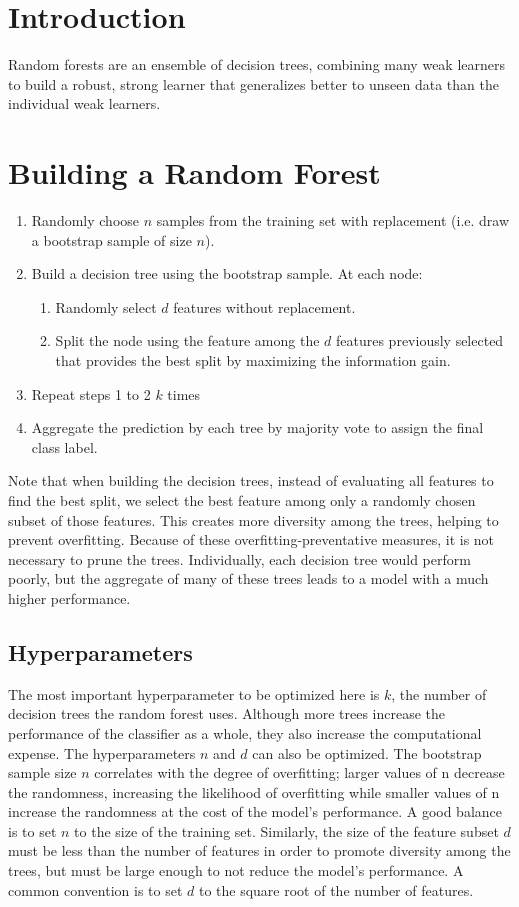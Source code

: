 \documentclass{article}
\begin{document}
\section{Introduction}
Random forests are an ensemble of decision trees, combining many weak learners to build a robust, strong learner that generalizes better to unseen data than the individual weak learners. 

\section{Building a Random Forest}
\begin{enumerate}
    \item Randomly choose $n$ samples from the training set with replacement (i.e. draw a bootstrap sample of size $n$).
    \item Build a decision tree using the bootstrap sample. At each node:
    \begin{enumerate}
        \item Randomly select $d$ features without replacement.
        \item Split the node using the feature among the $d$ features previously selected that provides the best split by maximizing the information gain.
    \end{enumerate}
    \item Repeat steps 1 to 2 $k$ times
    \item Aggregate the prediction by each tree by majority vote to assign the final class label.
\end{enumerate}
Note that when building the decision trees, instead of evaluating all features to find the best split, we select the best feature among only a randomly chosen subset of those features. This creates more diversity among the trees, helping to prevent overfitting. Because of these overfitting-preventative measures, it is not necessary to prune the trees. Individually, each decision tree would perform poorly, but the aggregate of many of these trees leads to a model with a much higher performance.

\subsection{Hyperparameters}
The most important hyperparameter to be optimized here is $k$, the number of decision trees the random forest uses. Although more trees increase the performance of the classifier as a whole, they also increase the computational expense. The hyperparameters $n$ and $d$ can also be optimized. The bootstrap sample size $n$ correlates with the degree of overfitting; larger values of n decrease the randomness, increasing the likelihood of overfitting while smaller values of n increase the randomness at the cost of the model's performance. A good balance is to set $n$ to the size of the training set. Similarly, the size of the feature subset $d$ must be less than the number of features in order to promote diversity among the trees, but must be large enough to not reduce the model's performance. A common convention is to set $d$ to the square root of the number of features. 
\end{document}
